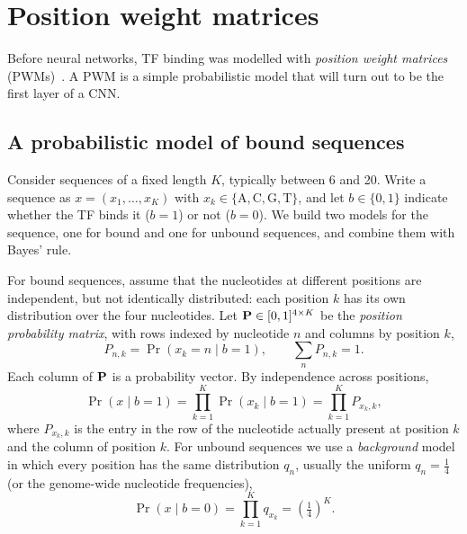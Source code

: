 \section{Position weight matrices}
\label{sec:pwm}

Before neural networks, TF binding was modelled with \emph{position weight matrices} (PWMs)~\citep{stormo2000}. A PWM is a simple probabilistic model that will turn out to be the first layer of a CNN.

\subsection{A probabilistic model of bound sequences}

Consider sequences of a fixed length $K$, typically between 6 and 20. Write a sequence as $x=(x_1,\dots,x_K)$ with $x_k\in\{\mathrm{A},\mathrm{C},\mathrm{G},\mathrm{T}\}$, and let $b\in\{0,1\}$ indicate whether the TF binds it ($b=1$) or not ($b=0$). We build two models for the sequence, one for bound and one for unbound sequences, and combine them with Bayes' rule.

For bound sequences, assume that the nucleotides at different positions are independent, but not identically distributed: each position $k$ has its own distribution over the four nucleotides. Let $\mathbf{P}\in[0,1]^{4\times K}$ be the \emph{position probability matrix}, with rows indexed by nucleotide $n$ and columns by position $k$,
\begin{equation}
  P_{n,k} = \Pr(x_k=n\mid b=1), \qquad \sum_{n}P_{n,k}=1 .
\end{equation}
Each column of $\mathbf{P}$ is a probability vector. By independence across positions,
\begin{equation}
  \Pr(x\mid b=1) = \prod_{k=1}^K\Pr(x_k\mid b=1) = \prod_{k=1}^K P_{x_k,k},
\end{equation}
where $P_{x_k,k}$ is the entry in the row of the nucleotide actually present at position $k$ and the column of position $k$. For unbound sequences we use a \emph{background} model in which every position has the same distribution $q_n$, usually the uniform $q_n=\frac14$ (or the genome-wide nucleotide frequencies),
\begin{equation}
  \Pr(x\mid b=0) = \prod_{k=1}^K q_{x_k} = \left(\tfrac14\right)^K .
\end{equation}

